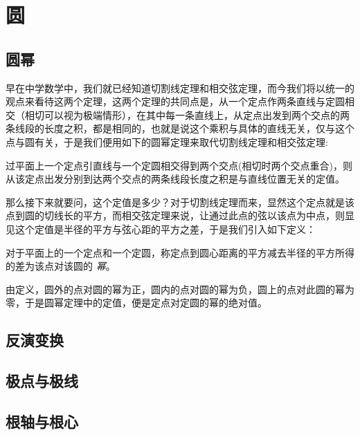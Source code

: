 
\section{圆}
\label{sec:circle}

\subsection{圆幂}
\label{sec:power-of-circle}

早在中学数学中，我们就已经知道切割线定理和相交弦定理，而今我们将以统一的观点来看待这两个定理，这两个定理的共同点是，从一个定点作两条直线与定圆相交（相切可以视为极端情形），在其中每一条直线上，从定点出发到两个交点的两条线段的长度之积，都是相同的，也就是说这个乘积与具体的直线无关，仅与这个点与圆有关，于是我们便用如下的圆幂定理来取代切割线定理和相交弦定理:

\begin{theorem}[圆幂定理]
  过平面上一个定点引直线与一个定圆相交得到两个交点(相切时两个交点重合)，则从该定点出发分别到达两个交点的两条线段长度之积是与直线位置无关的定值。
\end{theorem}

那么接下来就要问，这个定值是多少？对于切割线定理而来，显然这个定点就是该点到圆的切线长的平方，而相交弦定理来说，让通过此点的弦以该点为中点，则显见这个定值是半径的平方与弦心距的平方之差，于是我们引入如下定义：

\begin{definition}
  对于平面上的一个定点和一个定圆，称定点到圆心距离的平方减去半径的平方所得的差为该点对该圆的 \emph{幂}。
\end{definition}

由定义，圆外的点对圆的幂为正，圆内的点对圆的幂为负，圆上的点对此圆的幂为零，于是圆幂定理中的定值，便是定点对定圆的幂的绝对值。

\subsection{反演变换}
\label{sec:transformation-of-inversion}



\subsection{极点与极线}
\label{sec:pole-and-polar}


\subsection{根轴与根心}
\label{sec:radical-axis-and-center}





